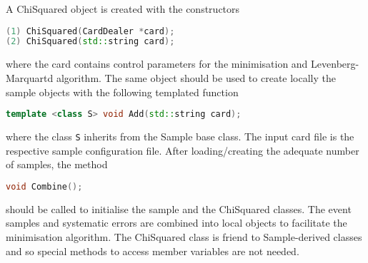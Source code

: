 \documentclass[a4paper, 11pt]{article}
\begin{document}
A ChiSquared object is created with the constructors
\begin{lstlisting}[language=C++]
(1) ChiSquared(CardDealer *card);
(2) ChiSquared(std::string card);
\end{lstlisting}
where the card contains control parameters for the minimisation and Levenberg-Marquartd algorithm.
The same object should be used to create locally the sample objects with the following templated function
\begin{lstlisting}[language=C++]
    template <class S> void Add(std::string card);
\end{lstlisting}
where the class \texttt{S} inherits from the Sample base class.
The input card file is the respective sample configuration file.
After loading/creating the adequate number of samples, the method
\begin{lstlisting}[language=C++]
    void Combine();
\end{lstlisting}
should be called to initialise the sample and the ChiSquared classes.
The event samples and systematic errors are combined into local objects to facilitate the minimisation algorithm.
The ChiSquared class is friend to Sample-derived classes and so special methods to access member variables are not needed.
\end{document}
